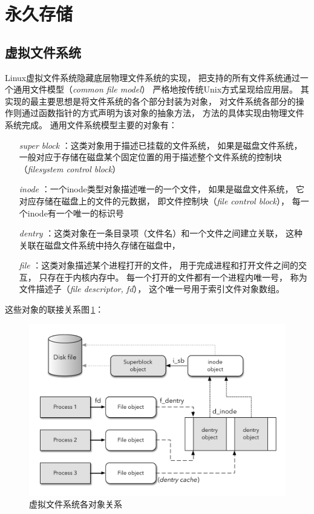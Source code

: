 \section{永久存储}

\subsection{虚拟文件系统}
Linux虚拟文件系统隐藏底层物理文件系统的实现，
把支持的所有文件系统通过一个通用文件模型（{\em common file model}）
严格地按传统{\sc Unix}方式呈现给应用层。
其实现的最主要思想是将文件系统的各个部分封装为对象，
对文件系统各部分的操作则通过函数指针的方式声明为该对象的抽象方法，
方法的具体实现由物理文件系统完成。
通用文件系统模型主要的对象有：

\begin{itemize}
\item[{\em super block}]：这类对象用于描述已挂载的文件系统，
  如果是磁盘文件系统，
  一般对应于存储在磁盘某个固定位置的用于描述整个文件系统的控制块
  （{\em filesystem control block}）
\item[{\em inode}]：一个inode类型对象描述唯一的一个文件，
  如果是磁盘文件系统，
  它对应存储在磁盘上的文件的元数据，
  即文件控制块（{\em file control block}），
  每一个inode有一个唯一的标识号
\item[{\em dentry}]：这类对象在一条目录项（文件名）和一个文件之间建立关联，
  这种关联在磁盘文件系统中持久存储在磁盘中，
\item[{\em file}]：这类对象描述某个进程打开的文件，
  用于完成进程和打开文件之间的交互，
  只存在于内核内存中。
  每一个打开的文件都有一个进程内唯一号，
  称为文件描述子（{\em file descriptor, fd}），
  这个唯一号用于索引文件对象数组。
\end{itemize}

这些对象的联接关系图\,\ref{fig:vfs_obj}：
\begin{figure}[!ht]
  \centering
  \includegraphics[width=\textwidth]{fig/vfs_objects.pdf}
  \caption{虚拟文件系统各对象关系}
  \label{fig:vfs_obj}
\end{figure}

